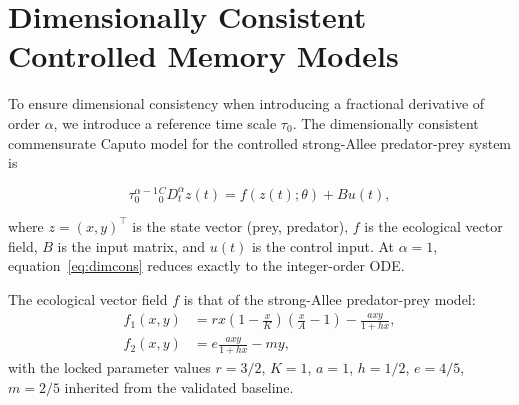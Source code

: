 \section{Dimensionally Consistent Controlled Memory Models}
\label{sec:models}

To ensure dimensional consistency when introducing a fractional derivative of order \(\alpha\), we introduce a reference time scale \(\tau_0\).
The dimensionally consistent commensurate Caputo model for the controlled strong-Allee predator-prey system is

\begin{equation}
\tau_0^{\alpha-1} {}_{0}^{C}D_{t}^{\alpha} z(t) = f(z(t);\theta) + B u(t),
\label{eq:dimcons}
\end{equation}

where \(z=(x,y)^\top\) is the state vector (prey, predator), \(f\) is the ecological vector field, \(B\) is the input matrix, and \(u(t)\) is the control input.
At \(\alpha=1\), equation~\eqref{eq:dimcons} reduces exactly to the integer-order ODE.

The ecological vector field \(f\) is that of the strong-Allee predator-prey model:
\begin{align}
f_1(x,y) &= r x \left(1-\frac{x}{K}\right) \left(\frac{x}{A}-1\right) - \frac{a x y}{1 + h x},\\
f_2(x,y) &= e \frac{a x y}{1 + h x} - m y,
\end{align}
with the locked parameter values \(r=3/2\), \(K=1\), \(a=1\), \(h=1/2\), \(e=4/5\), \(m=2/5\) inherited from the validated baseline.

